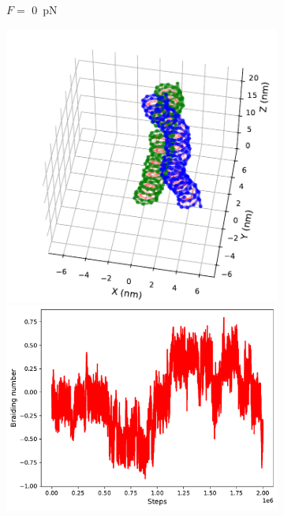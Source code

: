 \documentclass[a4paper,10pt]{article}
\begin{document}
\begin{figure}[tb]
\begin{subfigure}{.3\textwidth}
\caption{$F=$ \SI{0}{\pico\newton}}
\label{fig:braF_a}
\end{subfigure}
\begin{subfigure}{.3\textwidth}
\includegraphics[width=\textwidth]{brF_60_2000000.pdf}
\includegraphics[width=\textwidth]{brF_60_braid.pdf}

\end{subfigure}
\end{figure}
\end{document}
